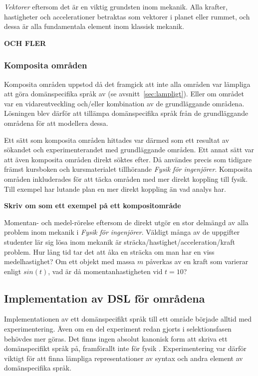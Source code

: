 \begin{binge}
\textit{Vektorer} eftersom det är en viktig grundsten inom mekanik. Alla krafter,
hastigheter och accelerationer betraktas som vektorer i planet eller
rummet, och dessa är alla fundamentala element inom klassisk mekanik.

\textbf{OCH FLER}
  
\subsubsection*{Komposita områden}

Komposita områden uppstod då det framgick att inte alla områden var lämpliga
att göra domänspecifika språk av (se avsnitt~\ref{sec:lampligt}). Eller om
området var en vidareutveckling och/eller kombination av de grundläggande
områdena. Lösningen blev därför att tillämpa domänspecifika språk från de
grundläggande områdena för att modellera dessa.

Ett sätt som komposita områden hittades var därmed som ett resultat av sökandet och
experimenterandet med grundläggande områden. Ett annat sätt var att även
komposita områden direkt söktes efter. Då användes precis som tidigare främst
kursboken och kursmaterialet tillhörande \textit{Fysik för ingenjörer}.
Komposita områden inkluderades för att täcka områden med mer direkt koppling
till fysik. Till exempel har lutande plan en mer direkt koppling än vad analys
har.

\textbf{Skriv om som ett exempel på ett kompositområde}

Momentan- och medel-rörelse eftersom de direkt utgör en stor delmängd
av alla problem inom mekanik i \textit{Fysik för ingenjörer}. Väldigt många av
de uppgifter studenter lär sig lösa inom mekanik är
sträcka/hastighet/acceleration/kraft problem. Hur lång tid tar det att åka en
sträcka om man har en viss medelhastighet? Om ett objekt med massa $m$
påverkas av en kraft som varierar enligt $sin(t)$, vad är då
momentanhastigheten vid $t=10$?

\subsection{Implementation av DSL för områdena}

Implementationen av ett domänspecifikt språk till ett område började alltid med
experimentering. Även om en del experiment redan gjorts i selektionsfasen
behövdes mer göras. Det finns ingen absolut kanonisk form  att skriva ett domänspecifikt språk på, framförallt inte för
fysik . Experimentering var därför viktigt för att finna
lämpliga representationer av syntax och andra element av domänspecifika språk.


\end{binge}
